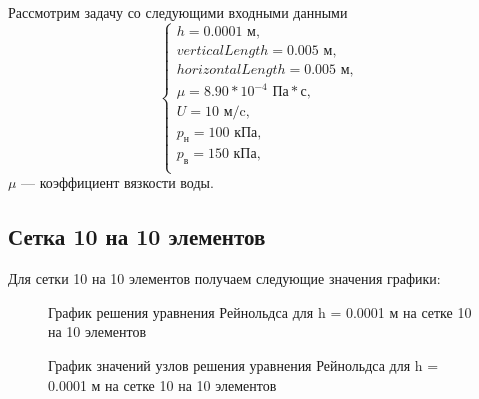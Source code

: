 \documentclass[a4paper,14pt]{extarticle}
\begin{document}
Рассмотрим задачу со следующими входными данными 
\begin{equation*}
	\begin{cases}
		h = 0.0001 \text{ м}, \\
		verticalLength = 0.005 \text{ м}, \\
		horizontalLength = 0.005 \text{ м}, \\
		\mu = 8.90 * 10^{-4} \text{ Па}*\text{с}, \\
		U = 10 \text{ м/c}, \\
		p_{\text{н}} = 100 \text{ кПа}, \\
		p_{\text{в}} = 150 \text{ кПа}, \\
	\end{cases}	
\end{equation*}
$\mu$ --- коэффициент вязкости воды.

\subsection{Сетка 10 на 10 элементов}

Для сетки 10 на 10 элементов получаем следующие значения графики:

\begin{figure}[!htbp]
	\caption{График решения уравнения Рейнольдса для h = 0.0001 м на сетке 10 на 10 элементов}
	\label{10x10mesh}
\end{figure}
\begin{figure}[!htbp]
		\caption{График значений узлов решения уравнения Рейнольдса для h = 0.0001 м на сетке 10 на 10 элементов}
	\label{10x10points}
\end{figure}
\end{document}
